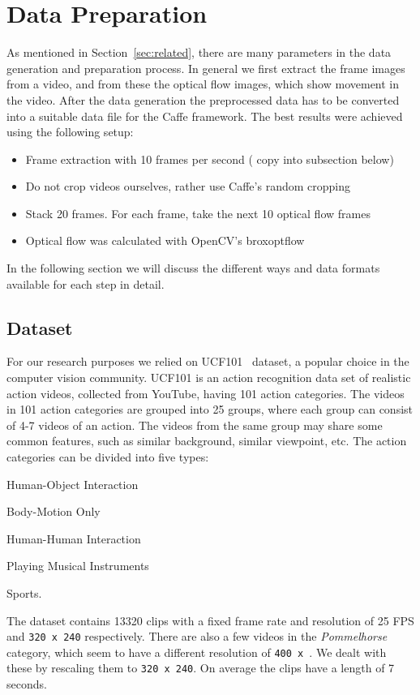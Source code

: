 \section{Data Preparation}
\label{sec:data}

As mentioned in Section~\ref{sec:related}, there are many parameters in the data generation and preparation process.
In general we first extract the frame images from a video, and from these the optical flow images, which show movement in the video.
After the data generation the preprocessed data has to be converted into a suitable data file for the Caffe framework.
The best results were achieved using the following setup:
\begin{itemize}
	\item Frame extraction with 10 frames per second ( copy into subsection below)
	\item Do not crop videos ourselves, rather use Caffe's random cropping
	\item Stack 20 frames. For each frame, take the next 10 optical flow frames
	\item Optical flow was calculated with OpenCV's broxoptflow~\cite{brox2004high}
\end{itemize}
In the following section we will discuss the different ways and data formats available for each step in detail.

\subsection{Dataset}
For our research purposes we relied on UCF101~\cite{soomro2012ucf101} dataset, a popular choice in the computer vision community.
UCF101 is an action recognition data set of realistic action videos, collected from YouTube, having 101 action categories.
The videos in 101 action categories are grouped into 25 groups, where each group can consist of 4-7 videos of an action.
The videos from the same group may share some common features, such as similar background, similar viewpoint, etc.
The action categories can be divided into five types:
\begin{enumerate*}
\item Human-Object Interaction
\item Body-Motion Only
\item Human-Human Interaction
\item Playing Musical Instruments
\item Sports.
\end{enumerate*}
The dataset contains 13320 clips with a fixed frame rate and resolution of 25 FPS and \texttt{320 x 240} respectively.
There are also a few videos in the \emph{Pommelhorse} category, which seem to have a different resolution of \texttt{400 x }.
We dealt with these by rescaling them to \texttt{320 x 240}.
On average the clips have a length of 7 seconds.

